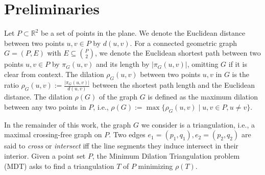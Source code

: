 \section{Preliminaries}
\label{sec:preliminaries}

Let $P \subset \mathbb{R}^2$ be a set of points in the plane.
We denote the Euclidean distance between two points $u,v \in P$ by $d(u,v)$.
For a connected geometric graph $G = (P, E)$ with $E \subseteq {P \choose 2}$, we denote the Euclidean shortest path between two points $u,v \in P$ by $\pi_G(u,v)$ and its length by $|\pi_G(u,v)|$,
omitting $G$ if it is clear from context.
The dilation $\rho_G(u,v)$ between two points $u,v$ in $G$ is the ratio $\rho_G(u,v) := \frac{|\pi_G(u,v)|}{d(u,v)}$ between the shortest path length and the Euclidean distance.
The dilation $\rho(G)$ of the graph $G$ is defined as the maximum dilation between any two points in $P$,
i.e., $\rho(G) := \max \{ \rho_G(u,v) \mid u,v \in P, u \neq v\}.$

In the remainder of this work, the graph $G$ we consider is a triangulation, i.e., a maximal crossing-free graph on $P$.
Two edges $e_1 = (p_1, q_1), e_2 = (p_2, q_2)$ are said to \emph{cross} or \emph{intersect} iff the line segments they induce intersect in their interior.
Given a point set $P$, the Minimum Dilation Triangulation problem (MDT) asks to find a triangulation $T$ of $P$ minimizing $\rho(T)$.

